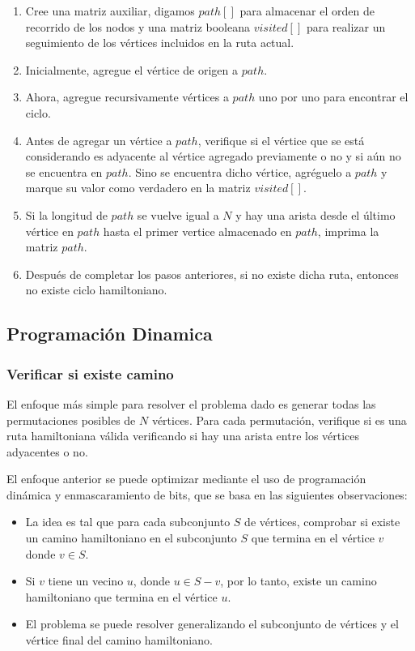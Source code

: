 \begin{enumerate}
	\item Cree una matriz auxiliar, digamos $path[]$ para almacenar el orden de recorrido de los nodos y una matriz booleana $visited[]$ para realizar un seguimiento de los vértices incluidos en la ruta actual.
	\item Inicialmente, agregue el vértice de origen a $path$.
	\item Ahora, agregue recursivamente vértices a $path$ uno por uno para encontrar el ciclo.
	\item Antes de agregar un vértice a $path$, verifique si el vértice que se está considerando es adyacente al vértice agregado previamente o no y si aún no se encuentra en $path$. Sino se encuentra dicho vértice, agréguelo a $path$  y marque su valor como verdadero en la matriz $visited[]$.
	\item Si la longitud de $path$ se vuelve igual a $N$ y hay una arista desde el último vértice en $path$ hasta el primer vertice almacenado en $path$, imprima la matriz $path$.
	\item Después de completar los pasos anteriores, si no existe dicha ruta, entonces no existe ciclo hamiltoniano.
\end{enumerate}

\subsection{Programación Dinamica}

\subsubsection{Verificar si existe camino}

El enfoque más simple para resolver el problema dado es generar todas las permutaciones posibles de $N$ vértices. Para cada permutación, verifique si es una ruta hamiltoniana válida verificando si hay una arista entre los vértices adyacentes o no.

El enfoque anterior se puede optimizar mediante el uso de programación dinámica y enmascaramiento de bits, que se basa en las siguientes observaciones:

\begin{itemize}
	\item La idea es tal que para cada subconjunto $S$ de vértices, comprobar si existe un camino hamiltoniano en el subconjunto $S$ que termina en el vértice $v$ donde $v \in S$.
	\item Si $v$ tiene un vecino $u$, donde $u \in S - {v}$, por lo tanto, existe un camino hamiltoniano que termina en el vértice $u$.
	\item El problema se puede resolver generalizando el subconjunto de vértices y el vértice final del camino hamiltoniano.
\end{itemize}

